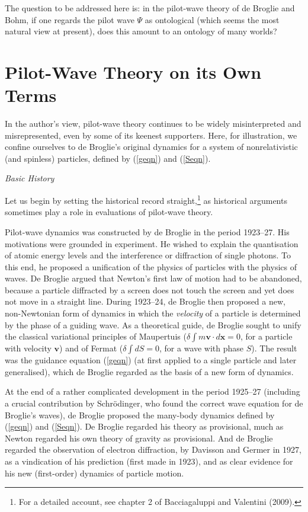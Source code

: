 \documentclass{article}%
\begin{document}
The question to be addressed here is: in the pilot-wave theory of de Broglie
and Bohm, if one regards the pilot wave $\Psi$ as ontological (which seems the
most natural view at present), does this amount to an ontology of many worlds?

\section{Pilot-Wave Theory on its Own Terms}

In the author's view, pilot-wave theory continues to be widely misinterpreted
and misrepresented, even by some of its keenest supporters. Here, for
illustration, we confine ourselves to de Broglie's original dynamics for a
system of nonrelativistic (and spinless) particles, defined by (\ref{geqn})
and (\ref{Seqn}).

\begin{center}
\textit{Basic History}
\end{center}

Let us begin by setting the historical record straight,\footnote{For a
detailed account, see chapter 2 of Bacciagaluppi and Valentini (2009).} as
historical arguments sometimes play a role in evaluations of pilot-wave theory.

Pilot-wave dynamics was constructed by de Broglie in the period 1923--27. His
motivations were grounded in experiment. He wished to explain the quantisation
of atomic energy levels and the interference or diffraction of single photons.
To this end, he proposed a unification of the physics of particles with the
physics of waves. De Broglie argued that Newton's first law of motion had to
be abandoned, because a particle diffracted by a screen does not touch the
screen and yet does not move in a straight line. During 1923--24, de Broglie
then proposed a new, non-Newtonian form of dynamics in which the
\textit{velocity} of a particle is determined by the phase of a guiding wave.
As a theoretical guide, de Broglie sought to unify the classical variational
principles of Maupertuis ($\delta\int m\mathbf{v}\cdot d\mathbf{x}=0$, for a
particle with velocity $\mathbf{v}$) and of Fermat ($\delta\int dS=0$, for a
wave with phase $S$). The result was the guidance equation (\ref{geqn}) (at
first applied to a single particle and later generalised), which de Broglie
regarded as the basis of a new form of dynamics.

At the end of a rather complicated development in the period 1925--27
(including a crucial contribution by Schr\"{o}dinger, who found the correct
wave equation for de Broglie's waves), de Broglie proposed the many-body
dynamics defined by (\ref{geqn}) and (\ref{Seqn}). De Broglie regarded his
theory as provisional, much as Newton regarded his own theory of gravity as
provisional. And de Broglie regarded the observation of electron diffraction,
by Davisson and Germer in 1927, as a vindication of his prediction (first made
in 1923), and as clear evidence for his new (first-order) dynamics of particle motion.
\end{document}
